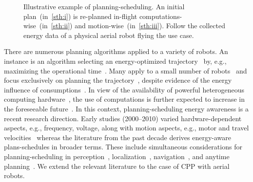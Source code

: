 \documentclass[letterpaper,10pt,journal,twoside]{IEEEtran}
\newcommand{\figpath}{./figures}
\theoremstyle{definition}
\begin{document}
\begin{figure}[t]
  \centering
  \vspace*{-6.8ex}
  \caption{Illustrative example of planning-scheduling. An initial plan~(in~\ref{sth:i}) is re-planned in-flight computations-wise~(in~\ref{sth:ii}) and motion-wise~(in~\ref{sth:iii}). Follow the collected energy data of a physical aerial robot flying the use case.}
  \label{fig:il-abs}
  \vspace*{-3.7ex}
\end{figure}

There are numerous planning algorithms applied to a variety of robots. An instance is an algorithm selecting an energy-optimized trajectory~\cite{mei2004energy} by, e.g., maximizing the operational time~\cite{wahab2015energy}. Many apply to a small number of robots~\cite{kim2005energy} and focus exclusively on planning the trajectory~\cite{kim2008minimum}, despite evidence of the energy influence of consumptions~\cite{mei2005case,ondruska2015scheduled,sudhakar2020balancing,brateman2006energy}. In view of the availability of powerful heterogeneous computing hardware~\cite{rizvi2017general}, the use of computations is further expected to increase in the foreseeable future~\cite{abramov2012real,satria2016real,jaramillo2019visual}. In this context, planning-scheduling energy awareness is a recent research direction. Early studies (2000--2010) varied hardware-dependent aspects, e.g., frequency, voltage, along with motion aspects, e.g., motor and travel velocities~\cite{mei2005case,brateman2006energy,zhang2007low,sadrpour2013mission} whereas the literature from the past decade derives energy-aware plans-schedules in broader terms. These include simultaneous considerations for planning-scheduling in perception~\cite{ondruska2015scheduled}, localization~\cite{lahijanian2018resource}, navigation~\cite{ho2019learning,ho2019qos,ho2018towards}, and anytime planning~\cite{sudhakar2020balancing}. We extend the relevant literature to the case of CPP with aerial robots. 
 
\end{document}

